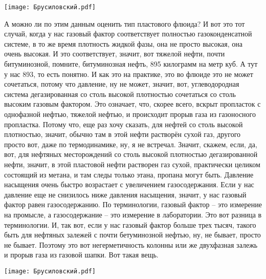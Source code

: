\documentclass[main.tex]{subfiles}
\begin{document}
\begin{center}
\texttt{[image: Брусиловский.pdf]}
\end{center}

А можно ли по этим данным оценить тип пластового флюида?
И вот это тот случай, когда у нас газовый фактор соответствует полностью газоконденсатной системе, в то же время плотность жидкой фазы, она не просто высокая, она очень высокая.
И это соответствует, значит, вот тяжелой нефти, почти битуминозной, помните, битуминозная нефть, 895 килограмм на метр куб.
А тут у нас 893, то есть понятно.
И как это на практике, это во флюиде это не может сочетаться, потому что давление, ну не может, значит, вот, углеводородная система дегазированная со столь высокой плотностью сочетаться со столь высоким газовым фактором.
Это означает, что, скорее всего, вскрыт пропласток с однофазной нефтью, тяжелой нефтью, и происходит прорыв газа из газоносного пропластка.
Потому что, еще раз хочу сказать, для нефтей со столь высокой плотностью, значит, обычно там в этой нефти растворён сухой газ, другого просто вот, даже по термодинамике, ну, я не встречал.
Значит, скажем, если, да, вот, для нефтяных месторождений со столь высокой плотностью дегазированной нефти, значит, в этой пластовой нефти растворен газ сухой, практически целиком состоящий из метана, и там следы только этана, пропана могут быть.
Давление насыщения очень быстро возрастает с увеличением газосодержания.
Если у нас давление еще не снизилось ниже давления насыщения, значит, у нас газовый фактор равен газосодержанию.
По терминологии, газовый фактор -- это измерение на промысле, а газосодержание -- это измерение в лаборатории.
Это вот разница в терминологии.
И, так вот, если у нас газовый фактор больше трех тысяч, такого быть для нефтяных залежей с почти бетуминозной нефтью, ну, не бывает, просто не бывает.
Поэтому это вот негерметичность колонны или же двухфазная залежь и прорыв газа из газовой шапки. Вот такая вещь.

\begin{center}
\texttt{[image: Брусиловский.pdf]}
\end{center}
\end{document}
